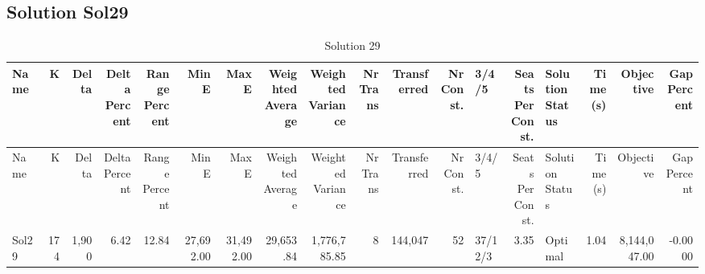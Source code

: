 \documentclass[a4paper]{article}
\begin{document}
\clearpage
\subsection{Solution Sol29}

{\scriptsize
\begin{longtable}{lrrrrrrrrrrrlrlrrr}
\caption{Solution 29}
\\ \toprule
Name &K &Delta &\shortstack{Delta\\Percent} &\shortstack{Range\\Percent} &Min E &Max E &\shortstack{Weighted\\Average} &\shortstack{Weighted\\Variance} &\shortstack{Nr\\Trans} &Transferred &\shortstack{Nr\\Const.} &3/4/5 &\shortstack{Seats\\Per\\Const.} &\shortstack{Solution\\Status} &\shortstack{Time\\(s)} &Objective &\shortstack{Gap\\Percent} \\ \midrule
\endfirsthead
\toprule
Name &K &Delta &\shortstack{Delta\\Percent} &\shortstack{Range\\Percent} &Min E &Max E &\shortstack{Weighted\\Average} &\shortstack{Weighted\\Variance} &\shortstack{Nr\\Trans} &Transferred &\shortstack{Nr\\Const.} &3/4/5 &\shortstack{Seats\\Per\\Const.} &\shortstack{Solution\\Status} &\shortstack{Time\\(s)} &Objective &\shortstack{Gap\\Percent} \\ \midrule
\endhead
\bottomrule
\endfoot
Sol29&174&1,900& 6.42&12.84&27,692.00&31,492.00&29,653.84&1,776,785.85&8&144,047&52&37/12/3& 3.35&Optimal& 1.04&8,144,047.00&-0.0000\\ 
\end{longtable}

}
\end{document}

